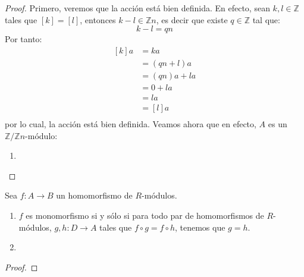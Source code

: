 \documentclass[12pt]{report}
\newcounter{it}
\theoremstyle{largebreak}
\newcommand\cf[3]{\ensuremath{#1:#2\rightarrow#3}}
\begin{document}
    \begin{proof}
        Primero, veremos que la acción está bien definida. En efecto, sean $k,l\in\mathbb{Z}$ tales que $[k]=[l]$, entonces $k-l\in\mathbb{Z}n$, es decir que existe $q\in\mathbb{Z}$ tal que:
        \begin{equation*}
            k-l=qn
        \end{equation*}
        Por tanto:
        \begin{equation*}
            \begin{split}
                [k]a&=ka\\
                &=(qn+l)a\\
                &=(qn)a+la\\
                &=0+la\\
                &=la\\
                &=[l]a\\
            \end{split}
        \end{equation*}
        por lo cual, la acción está bien definida. Veamos ahora que en efecto, $A$ es un $\mathbb{Z}/\mathbb{Z}n$-módulo:
        \begin{enumerate}[label = \textit{(\alph*)}]
            \item 
        \end{enumerate}
    \end{proof}

    \begin{excer}
        Sea $\cf{f}{A}{B}$ un homomorfismo de $R$-módulos.
        \begin{enumerate}[label = \textit{(\alph*)}]
            \item $f$ es monomorfismo si y sólo si para todo par de homomorfismos de $R$-módulos, $\cf{g,h}{D}{A}$ tales que $f\circ g=f\circ h$, tenemos que $g=h$.
            \item 
        \end{enumerate}
    \end{excer}

    \begin{proof}
        
    \end{proof}
\end{document}
